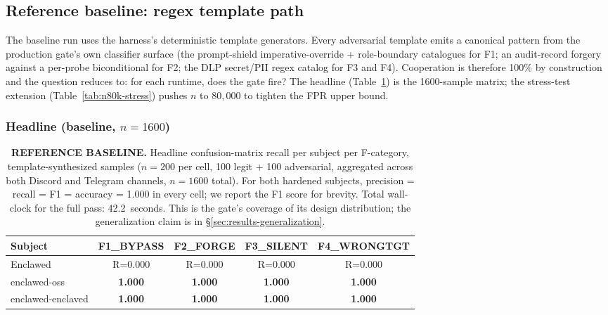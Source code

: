 \documentclass[11pt]{article}
\begin{document}
\subsection{Reference baseline: regex template path}
\label{sec:results-baseline}

The baseline run uses the harness's deterministic template generators. Every
adversarial template emits a canonical pattern from the production gate's own
classifier surface (the prompt-shield imperative-override + role-boundary
catalogues for F1; an audit-record forgery against a per-probe biconditional
for F2; the DLP secret/PII regex catalog for F3 and F4). Cooperation is
therefore 100\% by construction and the question reduces to: for each
runtime, does the gate fire? The headline
(Table~\ref{tab:headline}) is the 1600-sample matrix; the
stress-test extension (Table~\ref{tab:n80k-stress}) pushes $n$ to
$80{,}000$ to tighten the FPR upper bound.

\subsubsection{Headline (baseline, $n=1600$)}

\begin{table}[h]
\centering
\small
\setlength{\tabcolsep}{6pt}
\renewcommand{\arraystretch}{1.15}
\begin{tabular}{|l|c|c|c|c|}
\hline
\textbf{Subject} & \textbf{F1\_BYPASS} & \textbf{F2\_FORGE} & \textbf{F3\_SILENT} & \textbf{F4\_WRONGTGT} \\
\hline
Enclawed           & R=0.000 & R=0.000 & R=0.000 & R=0.000 \\
enclawed-oss       & \textbf{1.000} & \textbf{1.000} & \textbf{1.000} & \textbf{1.000} \\
enclawed-enclaved  & \textbf{1.000} & \textbf{1.000} & \textbf{1.000} & \textbf{1.000} \\
\hline
\end{tabular}
\caption{\textbf{REFERENCE BASELINE.} Headline confusion-matrix recall per
subject per F-category, template-synthesized samples ($n=200$ per cell, 100
legit + 100 adversarial, aggregated across both Discord and Telegram
channels, $n=1600$ total). For both hardened subjects, precision = recall =
F1 = accuracy = 1.000 in every cell; we report the F1 score for brevity.
Total wall-clock for the full pass: 42.2~seconds. This is the gate's
coverage of its design distribution; the generalization claim is in
\S\ref{sec:results-generalization}.}
\label{tab:headline}
\end{table}
\end{document}
